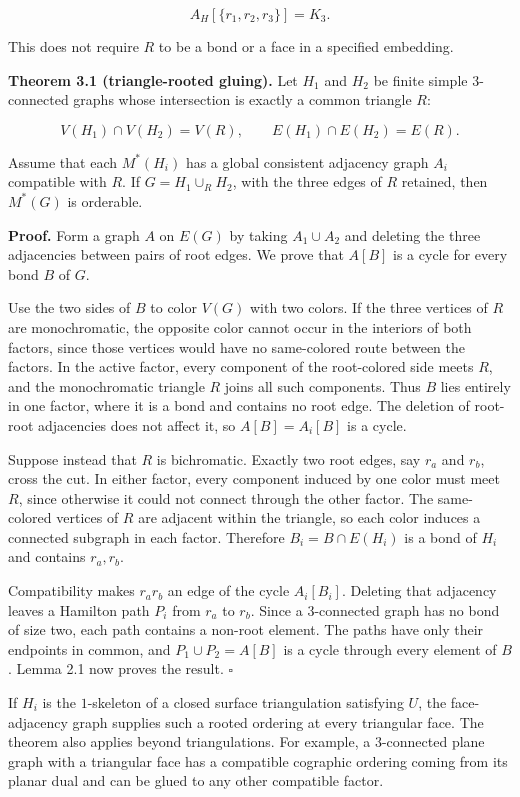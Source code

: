 \documentclass[11pt]{article}
\begin{document}
\[
A_H[\{r_1,r_2,r_3\}]=K_3.
\]

This does not require $R$ to be a bond or a face in a specified embedding.

\textbf{Theorem 3.1 (triangle-rooted gluing).} Let $H_1$ and $H_2$ be finite simple
$3$-connected graphs whose intersection is exactly a common triangle $R$:

\[
V(H_1)\cap V(H_2)=V(R),
\qquad
E(H_1)\cap E(H_2)=E(R).
\]

Assume that each $M^*(H_i)$ has a global consistent adjacency graph $A_i$
compatible with $R$. If $G=H_1\cup_R H_2$, with the three edges of $R$
retained, then $M^*(G)$ is orderable.

\textbf{Proof.} Form a graph $A$ on $E(G)$ by taking $A_1\cup A_2$ and deleting
the three adjacencies between pairs of root edges. We prove that $A[B]$ is a
cycle for every bond $B$ of $G$.

Use the two sides of $B$ to color $V(G)$ with two colors. If the three
vertices of $R$ are monochromatic, the opposite color cannot occur in the
interiors of both factors, since those vertices would have no same-colored
route between the factors. In the active factor, every component of the
root-colored side meets $R$, and the monochromatic triangle $R$ joins all
such components. Thus $B$ lies entirely in one factor, where it is a bond and
contains no root edge. The deletion of root-root adjacencies does not affect
it, so $A[B]=A_i[B]$ is a cycle.

Suppose instead that $R$ is bichromatic. Exactly two root edges, say $r_a$
and $r_b$, cross the cut. In either factor, every component induced by one
color must meet $R$, since otherwise it could not connect through the other
factor. The same-colored vertices of $R$ are adjacent within the triangle, so
each color induces a connected subgraph in each factor. Therefore
$B_i=B\cap E(H_i)$ is a bond of $H_i$ and contains $r_a,r_b$.

Compatibility makes $r_ar_b$ an edge of the cycle $A_i[B_i]$. Deleting that
adjacency leaves a Hamilton path $P_i$ from $r_a$ to $r_b$. Since a
$3$-connected graph has no bond of size two, each path contains a non-root
element. The paths have only their endpoints in common, and
$P_1\cup P_2=A[B]$ is a cycle through every element of $B$. Lemma 2.1 now
proves the result. $\square$

If $H_i$ is the $1$-skeleton of a closed surface triangulation satisfying
$U$, the face-adjacency graph supplies such a rooted ordering at every
triangular face. The theorem also applies beyond triangulations. For example,
a $3$-connected plane graph with a triangular face has a compatible cographic
ordering coming from its planar dual and can be glued to any other compatible
factor.
\end{document}
